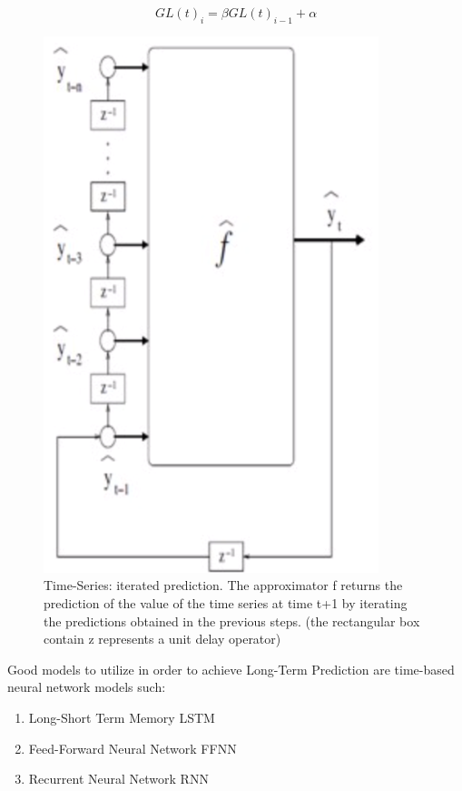 \begin{equation}
GL(t)_i = \beta GL(t)_{i-1} + \alpha
\label{time-series-eq}
\end{equation}

\begin{center}
\begin{figure}[ht!]
	\centering
    \includegraphics[scale = 0.6]{Figures/mo/time-series.png}
 	\caption{Time-Series: iterated prediction. The approximator f returns the prediction of the value of the time series at time t+1 by iterating the predictions obtained in the previous steps. (the rectangular box contain z represents a unit delay operator)}
  	\label{time-series}
\end{figure}
\end{center}

Good models to utilize in order to achieve Long-Term Prediction are time-based neural network models such: 

\begin{enumerate}
\item Long-Short Term Memory LSTM
\item Feed-Forward Neural Network FFNN
\item Recurrent Neural Network RNN
\end{enumerate}

